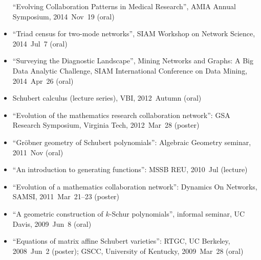 \documentclass[10pt,a4paper]{article}
\begin{document}
\begin{itemize}[label=$\circ$,nolistsep]
``Evolving Collaboration Patterns in Medical Research'', AMIA Annual Symposium, 2014~Nov~19 (oral)
\item
``Triad census for two-mode networks'', SIAM Workshop on Network Science, 2014~Jul~7 (oral)
\item
``Surveying the Diagnostic Landscape'', Mining Networks and Graphs: A Big Data Analytic Challenge, SIAM International Conference on Data Mining, 2014~Apr~26 (oral)
\item
Schubert calculus (lecture series), VBI, 2012~Autumn (oral)
\item
``Evolution of the mathematics research collaboration network'': GSA Research Symposium, Virginia Tech, 2012~Mar~28 (poster)
\item
``Gr\"obner geometry of Schubert polynomials'': Algebraic Geometry seminar, 2011~Nov (oral)
\item
``An introduction to generating functions'': MSSB REU, 2010~Jul (lecture)
\item
``Evolution of a mathematics collaboration network'': Dynamics On Networks, SAMSI, 2011~Mar~21--23 (poster)
\item
``A geometric construction of \(k\)-Schur polynomials'', informal seminar, UC Davis, 2009~Jun~8 (oral)
\item
``Equations of matrix affine Schubert varieties'': RTGC, UC Berkeley, 2008~Jun~2 (poster); GSCC, University of Kentucky, 2009~Mar~28 (oral)
\end{itemize}
\end{document}
